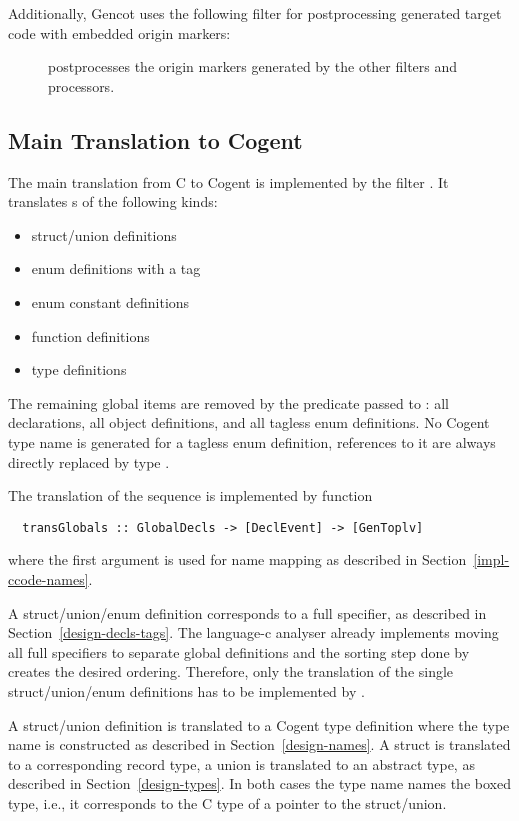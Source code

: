 Additionally, Gencot uses the following filter for postprocessing generated target code with embedded origin markers:
\begin{description}
\item[] postprocesses the origin markers generated by the other filters and processors.
\end{description}

\subsection{Main Translation to Cogent}
\label{impl-ccode-main}

The main translation from C to Cogent is implemented by the filter . It translates s
of the following kinds:
\begin{itemize}
\item struct/union definitions
\item enum definitions with a tag
\item enum constant definitions
\item function definitions
\item type definitions
\end{itemize}
The remaining global items are removed by the predicate passed to : all declarations, 
all object definitions, and all tagless enum definitions. No Cogent type name is generated for a tagless enum definition,
references to it are always directly replaced by type .

The translation of the  sequence is implemented by function
\begin{verbatim}
  transGlobals :: GlobalDecls -> [DeclEvent] -> [GenToplv]
\end{verbatim}
where the first argument is used for name mapping as described in Section~\ref{impl-ccode-names}.

A struct/union/enum definition corresponds to a full specifier, as described in Section~\ref{design-decls-tags}.
The language-c analyser already implements moving all full specifiers to separate global definitions and the
sorting step done by  creates the desired ordering. Therefore, only the translation
of the single struct/union/enum definitions has to be implemented by .

A struct/union definition is translated to a Cogent type definition where the type name is constructed as described 
in Section~\ref{design-names}. A struct is translated to a corresponding record type, a union is translated to an 
abstract type, as described in Section~\ref{design-types}.
In both cases the type name names the boxed type, i.e., it corresponds to the C type of a pointer to the struct/union.

